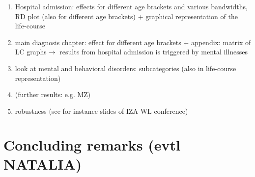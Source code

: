 \documentclass[11pt, a4paper,draft]{article} %
\begin{document}
\begin{enumerate}
	\item Hospital admission: effects for different age brackets and various bandwidths, RD plot (also for different age brackets) + graphical representation of the life-course
	\item main diagnosis chapter: effect for different age brackets + appendix: matrix of LC graphs\newline $\rightarrow$ results from hospital admission is triggered by mental illnesses
	\item look at mental and behavioral disorders: subcategories (also in life-course representation) 
	\item (further results: e.g. MZ)
	\item robustness (see for instance slides of IZA WL conference)
\end{enumerate}




\section{Concluding remarks (evtl NATALIA)}\label{sec:conclusion}
\end{document}
